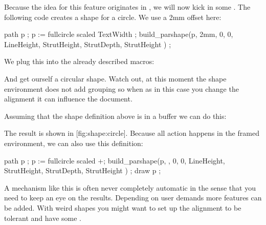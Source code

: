 \typebuffer[option=TEX]

\start \getbuffer \stop

Because the idea for this feature originates in \METAFUN, we will now kick in
some \METAPOST. The following code creates a shape for a circle. We use a
2mm offset here:

\startbuffer
{}
    path p ; p := fullcircle scaled TextWidth ;
    build_parshape(p,
        2mm, 0, 0,
        LineHeight, StrutHeight, StrutDepth, StrutHeight
    ) ;
\stopuseMPgraphic
\stopbuffer

\typebuffer[option=TEX]

\start \getbuffer \stop

We plug this into the already described macros:

\startbuffer
\startshapedparagraph[mp=circle]%
\stopshapedparagraph
\stopbuffer

\typebuffer[option=TEX]

And get ourself a circular shape. Watch out, at this moment the shape environment
does not add grouping so when as in this case you change the alignment it can
influence the document.

\start \getbuffer \stop

\startbuffer[framed]
\framed[align=normal,width=\textwidth,offset=2mm,strut=no]\bgroup
    \getbuffer
\egroup
\stopbuffer

Assuming that the shape definition above is in a buffer we can do this:

\typebuffer[option=TEX]

The result is shown in  [fig:shape:circle]. Because all action
happens in the framed environment, we can also use this definition:

\starttyping[option=TEX]
    path p ; p := fullcircle scaled \the\dimexpr\framedwidth+\relax ;
    build_parshape(p,
        \framedoffset, 0, 0,
        LineHeight, StrutHeight, StrutDepth, StrutHeight
    ) ;
    draw p ;
\stopuseMPgraphic
\stoptyping

\startplacefigure[title=A framed circular shape,reference=fig:shape:circle]
    \getbuffer[framed]
\stopplacefigure

A mechanism like this is often never completely automatic in the sense that you
need to keep an eye on the results. Depending on user demands more features can
be added. With weird shapes you might want to set up the alignment to be \type
{tolerant} and have some .

